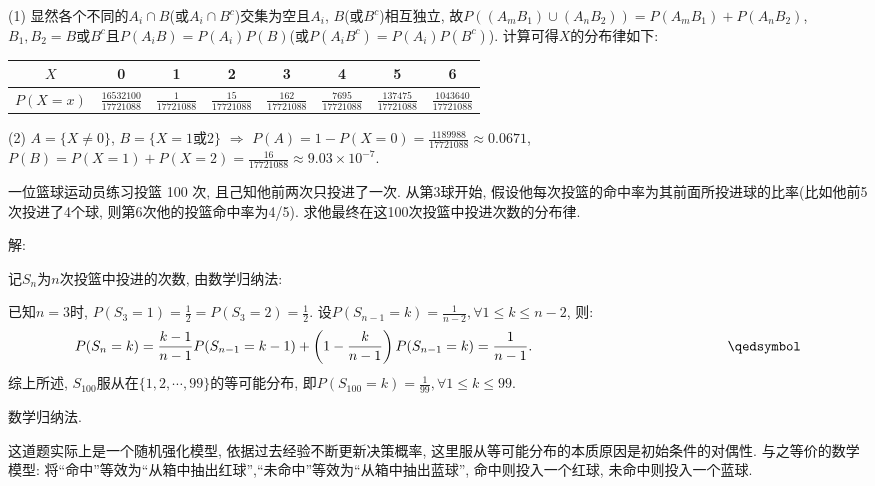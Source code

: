 \documentclass[standard]{ExBook}
\begin{document}
\begin{qitems}
\begin{bbox}
(1) 显然各个不同的$A_{i}\cap B$(或$A_{i}\cap B^{c}$)交集为空且$A_{i}$, $B$(或$B^c$)相互独立, 故$P((A_{m}B_{1})\cup(A_{n}B_{2}))=P(A_{m}B_{1})+P(A_{n}B_{2})$, $B_{1},B_{2}=B\text{或}B^c$且$P(A_{i}B)=P(A_{i})P(B)$(或$P(A_{i}B^{c})=P(A_{i})P(B^{c})$). 计算可得$X$的分布律如下:
\begin{center}
\setlength{\tabcolsep}{13pt}
\begin{tabular}{c|c|c|c|c|c|c|c}
\hline
$X$ & 0 & 1 & 2 & 3 & 4 & 5 & 6 \\
\hline
$P(X=x)$ & $\frac{16532100}{17721088}$ & $\frac{1}{17721088}$ & $\frac{15}{17721088}$ & $\frac{162}{17721088}$ & $\frac{7695}{17721088}$ & $\frac{137475}{17721088}$ & $\frac{1043640}{17721088}$ \\
\hline
\end{tabular}
\end{center}
(2) $A=\{X \neq 0\}$, $B=\{X=1\text{或}2\}$ $\Longrightarrow$ $P(A)=1-P(X=0)=\frac{1189988}{17721088}\approx0.0671$, $P(B)=P(X=1)+P(X=2)=\frac{16}{17721088}\approx9.03\times10^{-7}$.
    \end{bbox}

\vspace{-5em}

    \begin{bbox}
    \begin{shaded}
        \qitem
一位篮球运动员练习投篮 100 次, 且己知他前两次只投进了一次. 从第3球开始, 假设他每次投篮的命中率为其前面所投进球的比率(比如他前5次投进了4个球, 则第6次他的投篮命中率为4/5). 求他最终在这100次投篮中投进次数的分布律.
    \end{shaded}
    \end{bbox}

\vspace{-5em}

    \begin{bbox}
解: 

记$S_n$为$n$次投篮中投进的次数, 由数学归纳法:

已知$n=3$时, $P(S_{3}=1)=\frac{1}{2}=P(S_{3}=2)=\frac{1}{2}$. 设$P(S_{n-1}=k)=\frac{1}{n-2},\forall1 \leq k \leq n-2$, 则: 
$$P(S_{n}=k)=\frac{k-1}{n-1}P(S_{n-1}=k-1)+\left(1-\frac{k}{n-1}\right)P(S_{n-1}=k)=\frac{1}{n-1}. \qquad\qquad\qquad\qquad\qquad\qquad\qquad\qedsymbol$$
综上所述, $S_{100}$服从在$\{1,2,\cdots,99\}$的等可能分布, 即$P(S_{100}=k)=\frac{1}{99},\forall1 \leq k \leq 99.$

\textcolor{themeColor}{\selectfont {} 数学归纳法.}

\textcolor{themeColor}{\selectfont {} 这道题实际上是一个随机强化模型, 依据过去经验不断更新决策概率, 这里服从等可能分布的本质原因是初始条件的对偶性. 与之等价的数学模型: 将``命中''等效为``从箱中抽出红球'',``未命中''等效为``从箱中抽出蓝球'', 命中则投入一个红球, 未命中则投入一个蓝球.}
    \end{bbox}


\end{qitems}
\end{document}
